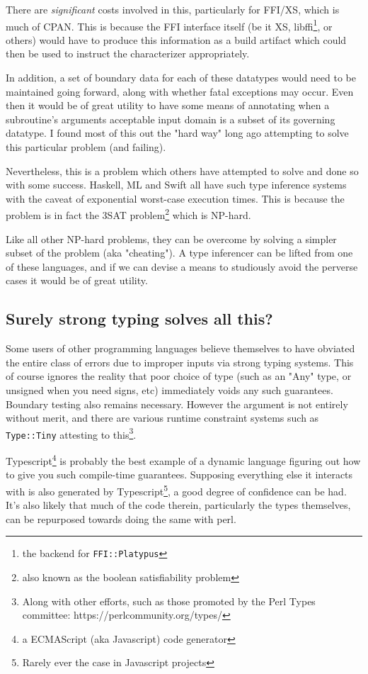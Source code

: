 \documentclass{article}
\begin{document}
There are \textit{significant} costs involved in this, particularly for FFI/XS, which is much of CPAN.
This is because the FFI interface itself (be it XS, libffi\footnote{the backend for \texttt{FFI::Platypus}}, or others) would have to produce this information as a build artifact
which could then be used to instruct the characterizer appropriately.

In addition, a set of boundary data for each of these datatypes would need to be maintained going forward, along with whether fatal exceptions may occur.
Even then it would be of great utility to have some means of annotating when a subroutine's arguments acceptable input domain is a subset of its governing datatype.
I found most of this out the "hard way" \cite{gsb} long ago attempting to solve this particular problem (and failing).

Nevertheless, this is a problem which others have attempted to solve and done so with some success.
Haskell, ML and Swift all have such type inference systems with the caveat of exponential worst-case execution times\cite{clippert}.
This is because the problem is in fact the 3SAT problem\footnote{also known as the boolean satisfiability problem} which is NP-hard\cite{mltype}.

Like all other NP-hard problems, they can be overcome by solving a simpler subset of the problem (aka "cheating").
A type inferencer can be lifted from one of these languages, and if we can devise a means to studiously avoid the perverse cases it would be of great utility.

\subsection{Surely strong typing solves all this?}

Some users of other programming languages believe themselves to have obviated the entire class of errors due to improper inputs via strong typing systems.
This of course ignores the reality that poor choice of type (such as an "Any" type, or unsigned when you need signs, etc) immediately voids any such guarantees.
Boundary testing also remains necessary.
However the argument is not entirely without merit, and there are various runtime constraint systems such as \texttt{Type::Tiny} attesting to this\footnote{Along with other efforts, such as those promoted by the Perl Types committee: https://perlcommunity.org/types/}.

Typescript\footnote{a ECMAScript (aka Javascript) code generator} is probably the best example of a dynamic language figuring out how to give you such compile-time guarantees.
Supposing everything else it interacts with is also generated by Typescript\footnote{Rarely ever the case in Javascript projects}, a good degree of confidence can be had.
It's also likely that much of the code therein, particularly the types themselves, can be repurposed towards doing the same with perl.
\end{document}

